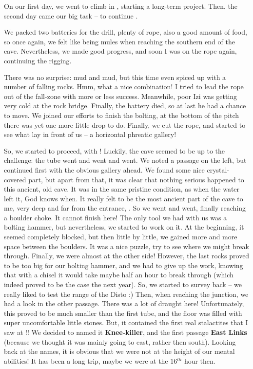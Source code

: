 On our first day, we went to climb in ,
starting a long-term project. Then, the second day came our big task --
to continue .

We packed two batteries for the drill, plenty of rope, also a good
amount of food, so once again, we felt like being mules when reaching
the southern end of the cave. Nevertheless, we made good progress, and
soon I was on the rope again, continuing the rigging.

There was no surprise: mud and mud, but this time even spiced up with a
number of falling rocks. Hmm, what a nice combination! I tried to lead
the rope out of the fall-zone with more or less success. Meanwhile, poor
Izi was getting very cold at the rock bridge. Finally, the battery died,
so at last he had a chance to move. We joined our efforts to finish the
bolting, at the bottom of the pitch there was yet one more little drop
to do. Finally, we cut the rope, and started to see what lay in front of
us -- a horizontal phreatic gallery!

So, we started to proceed, with ! Luckily, the cave seemed to be up to the
challenge: the tube went and went and went. We noted a passage on the
left, but continued first with the obvious gallery ahead. We found some
nice crystal-covered part, but apart from that, it was clear that
nothing serious happened to this ancient, old cave. It was in the same
pristine condition, as when the water left it, God knows when. It really
felt to be the most ancient part of the cave to me, very deep and far
from the entrance, . So we went and
went, finally reaching a boulder choke. It cannot finish here! The only
tool we had with us was a bolting hammer, but nevertheless, we started
to work on it. At the beginning, it seemed completely blocked, but then
little by little, we gained more and more space between the boulders. It
was a nice puzzle, try to see where we might break through. Finally, we
were almost at the other side! However, the last rocks proved to be too
big for our bolting hammer, and we had to give up the work, knowing that
with a chisel it would take maybe half an hour to break through (which
indeed proved to be the case the next year). So, we started to survey
back -- we really liked to test the range of the Disto :) Then, when
reaching the junction, we had a look in the other passage. There was a
lot of draught here! Unfortunately, this proved to be much smaller than
the first tube, and the floor was filled with super uncomfortable little
stones. But, it contained the first real stalactites that I saw at !!
We decided to named it \textbf{Knee-killer}, and the first passage
\textbf{East Links} (because we thought it was mainly going to east,
rather then south). Looking back at the names, it is obvious that we
were not at the height of our mental abilities! It has been a long trip,
maybe we were at the 16\(^{th}\) hour then.


